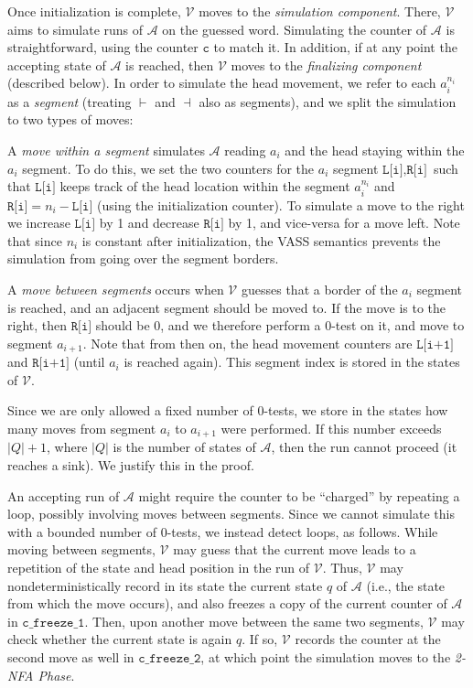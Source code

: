 \documentclass[USenglish]{lipics-v2021}
\newcommand{\lmark}{\vdash}
\newcommand{\rmark}{\dashv}
\newcommand{\vf}[1]{\texttt{#1}}
\newcommand{\cA}{\mathcal{A}}
\newcommand{\cV}{\mathcal{V}}
\begin{document}
Once initialization is complete, $\cV$ moves to the \emph{simulation
	component}. There, $\cV$ aims to simulate runs of $\cA$ on the guessed
word. Simulating the counter of $\cA$ is straightforward, using the counter $\vf{c}$ to match it.
In addition, if at any point the accepting state of $\cA$ is reached, then $\cV$ moves to the \emph{finalizing component} (described
below). 
In order to simulate the head movement, we refer to each $a_i^{n_i}$ as
a \emph{segment} (treating $\lmark$ and $\rmark$ also as segments), and we split
the simulation to two types of moves:
\begin{compactitem}
	\item A \emph{move within a segment} simulates $\cA$ reading $a_i$ and the
	head staying within the $a_i$ segment. To do this, we set the two counters for
	the $a_i$ segment $\vf{L[i]},\vf{R[i]}$ such that $\vf{L[i]}$ keeps track of the head
	location within the segment $a_i^{n_i}$ and $\vf{R[i]}=n_i-\vf{L[i]}$ (using the
	initialization counter). To simulate a move to the right we increase $\vf{L[i]}$
	by 1 and decrease $\vf{R[i]}$ by 1, and vice-versa for a move left. Note that
	since $n_i$ is constant after initialization, the VASS semantics prevents
	the simulation from going over the segment borders.
	\item A \emph{move between segments} occurs when $\cV$ guesses that a border
	of the $a_i$ segment is reached, and an adjacent segment should be moved
	to. If the move is to the right, then $\vf{R[i]}$ should be $0$, and we therefore
	perform a $0$-test on it, and move to segment $a_{i+1}$. Note that from then
	on, the head movement counters are $\vf{L[i+1]}$ and $\vf{R[i+1]}$ (until $a_i$ is
	reached again). This segment index is stored in the states of $\cV$.
	
	Since we are only allowed a fixed number of $0$-tests, we store in the
	states how many moves from segment $a_i$ to $a_{i+1}$ were performed. If
	this number exceeds $|Q|+1$, where $|Q|$ is the number of states of $\cA$,
	then the run cannot proceed (it reaches a sink). We justify this in the
	proof.
\end{compactitem}

An accepting run of $\cA$ might require the counter to be ``charged'' by
repeating a loop, possibly involving moves between segments. Since we cannot
simulate this with a bounded number of $0$-tests, we instead detect loops, as
follows.  While moving between segments, $\cV$ may guess that the current move
leads to a repetition of the state and head position in the run of $\cV$. Thus,
$\cV$ may nondeterministically record in its state the current state $q$ of
$\cA$ (i.e., the state from which the move occurs), and also freezes a copy of
the current counter of $\cA$ in $\vf{c\_freeze\_1}$.  Then, upon another move
between the same two segments, $\cV$ may check whether the current state is
again $q$. If so, $\cV$ records the counter at the second move as well in
$\vf{c\_freeze\_2}$, at which point the simulation moves to the \emph{2-NFA
	Phase}.
\end{document}
